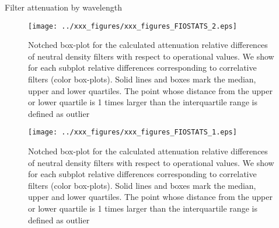 \vspace{.5cm}
\begin{table}[hbp!] \centering
	\caption{Filter attenuation by wavelength}
	\label{tab:filter_table}
	
\end{table}

\vspace{.5cm}
\begin{figure}[hbtp!]
\begin{center}

{%
\texttt{[image: ../xxx\_figures/xxx\_figures\_FIOSTATS\_2.eps]}
         \caption{Notched box-plot for the calculated attenuation relative differences of neutral density filters with respect to operational values. We show for each subplot relative differences corresponding to correlative filters (color box-plots). Solid lines and boxes mark the median, upper and lower quartiles. The point whose distance from the upper or lower quartile is 1 times larger than the interquartile range is defined as outlier}
         \label{fig:FIOSTATS}
}
{%
\texttt{[image: ../xxx\_figures/xxx\_figures\_FIOSTATS\_1.eps]}
         \caption{Notched box-plot for the calculated attenuation relative differences of neutral density filters with respect to operational values. We show for each subplot relative differences corresponding to correlative filters (color box-plots). Solid lines and boxes mark the median, upper and lower quartiles. The point whose distance from the upper or lower quartile is 1 times larger than the interquartile range is defined as outlier}
         \label{fig:FIOSTATS}
}

\end{center}
\end{figure}
